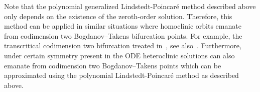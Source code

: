 \begin{remark}
    Note that the polynomial generalized Lindstedt-Poincar\'e method described
    above only depends on the existence of the zeroth-order solution.
    Therefore, this method can be applied in similar situations where
    homoclinic orbits emanate from codimension two Bogdanov--Takens bifurcation
    points. For example, the transcritical codimension two bifurcation treated
    in~\cite{Hirschberg_1991}, see also~\cite[Appendix C.2]{Bosschaert@2016}.
    Furthermore, under certain symmetry present in the ODE heteroclinic
    solutions can also emanate from codimension two Bogdanov--Takens points
    which can be approximated using the polynomial Lindstedt-Poincar\'e method
    as described above.
\end{remark}
